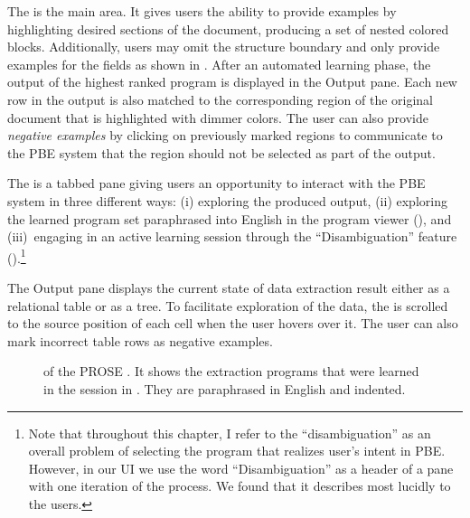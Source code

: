 
The \InputTextView is the main area.
It gives users the ability to provide examples by highlighting desired sections of the document, producing a set of
nested colored blocks.
Additionally, users may omit the structure boundary and only provide examples for the fields as shown in
.
After an automated learning phase, the output of the highest ranked program is displayed in the Output pane.
Each new row in the output is also matched to the corresponding region of the original document that is highlighted with
dimmer colors.
The user can also provide \emph{negative examples} by clicking on previously marked regions to communicate to the PBE
system that the region
should not be selected as part of the output.

The \PBEView is a tabbed pane giving users an opportunity to interact with the PBE system in three different ways: (i)
exploring the produced output,
(ii) exploring the learned program set paraphrased into English in the program viewer (\ProgramNavigation),
and (iii)~engaging in an active learning session through the ``Disambiguation'' feature
(\ConversationalClarification).\footnote{
    Note that throughout this chapter, I refer to the ``disambiguation'' as an overall problem of selecting the program
    that realizes user's intent in PBE.
    However, in our UI we use the word ``Disambiguation'' as a header of a pane with one iteration of the
    \ConversationalClarification process.
    We found that it describes \ConversationalClarification most lucidly to the users.
}

The Output pane displays the current state of data extraction result either as a relational table or as a tree.
To facilitate exploration of the data, the \InputTextView is scrolled to
the source position of each cell when the user hovers over it.
The user can also mark incorrect table rows as negative examples.

\begin{figure}[t]
    \centering
    \uwsinglespace
    \begin{tcbraster}[beamer, raster columns=1, size=minimal]
        \centering
    \end{tcbraster}
    \caption{\ProgramNavigationTab of the PROSE \FlashProg.
        It shows the extraction programs that were learned in the session in .
        They are paraphrased in English and indented.}
    \label{fig:interactive:ui:paraphrasing}
\end{figure}


